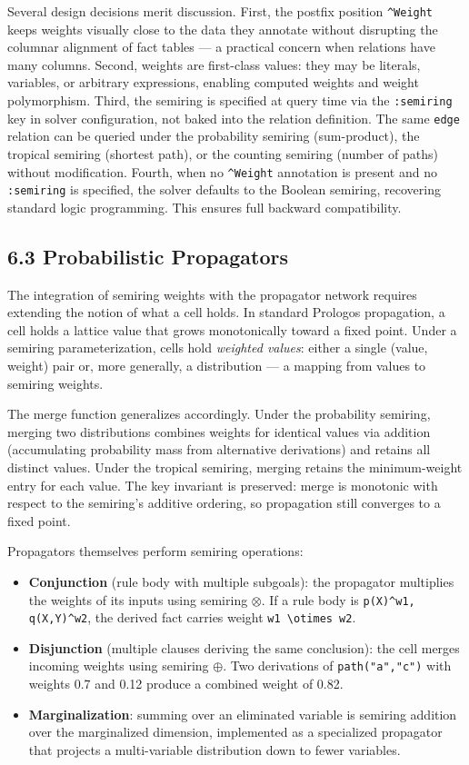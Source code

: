 \documentclass[11pt]{article}
\begin{document}
Several design decisions merit discussion. First, the postfix position \texttt{\textasciicircum{}Weight} keeps weights visually close to the data they annotate without disrupting the columnar alignment of fact tables --- a practical concern when relations have many columns. Second, weights are first-class values: they may be literals, variables, or arbitrary expressions, enabling computed weights and weight polymorphism. Third, the semiring is specified at query time via the \texttt{:semiring} key in solver configuration, not baked into the relation definition. The same \texttt{edge} relation can be queried under the probability semiring (sum-product), the tropical semiring (shortest path), or the counting semiring (number of paths) without modification. Fourth, when no \texttt{\textasciicircum{}Weight} annotation is present and no \texttt{:semiring} is specified, the solver defaults to the Boolean semiring, recovering standard logic programming. This ensures full backward compatibility.
\subsection{6.3 Probabilistic Propagators}
\label{sec:org3de65df}

The integration of semiring weights with the propagator network requires extending the notion of what a cell holds. In standard Prologos propagation, a cell holds a lattice value that grows monotonically toward a fixed point. Under a semiring parameterization, cells hold \emph{weighted values}: either a single (value, weight) pair or, more generally, a distribution --- a mapping from values to semiring weights.

The merge function generalizes accordingly. Under the probability semiring, merging two distributions combines weights for identical values via addition (accumulating probability mass from alternative derivations) and retains all distinct values. Under the tropical semiring, merging retains the minimum-weight entry for each value. The key invariant is preserved: merge is monotonic with respect to the semiring's additive ordering, so propagation still converges to a fixed point.

Propagators themselves perform semiring operations:

\begin{itemize}
\item \textbf{Conjunction} (rule body with multiple subgoals): the propagator multiplies the weights of its inputs using semiring \(\otimes\). If a rule body is \texttt{p(X)\textasciicircum{}w1, q(X,Y)\textasciicircum{}w2}, the derived fact carries weight \texttt{w1 \textbackslash{}otimes w2}.
\item \textbf{Disjunction} (multiple clauses deriving the same conclusion): the cell merges incoming weights using semiring \(\oplus\). Two derivations of \texttt{path("a","c")} with weights 0.7 and 0.12 produce a combined weight of 0.82.
\item \textbf{Marginalization}: summing over an eliminated variable is semiring addition over the marginalized dimension, implemented as a specialized propagator that projects a multi-variable distribution down to fewer variables.
\end{itemize}
\end{document}
